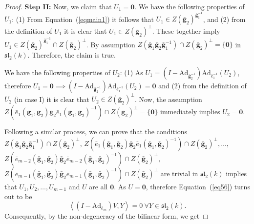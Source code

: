 \documentclass[10pt,twoside]{amsart}
\theoremstyle{definition}
\theoremstyle{definition}
\begin{document}
\begin{proof}
{\bf Step II:} Now, we claim that $U_1 = \mathbf{0}$. We have the following properties of $U_1$: (1) From Equation~(\ref{eqmain1}) it follows that $U_1 \in Z(\mathbf{\bar g}_2)^{\mathbf{\bar g}_1^{-1}}$, and (2) from the definition of $U_1$ it is clear that $U_1\in Z(\mathbf{\bar g}_2)^{\perp}$. These together imply $U_1\in Z(\mathbf{\bar g}_2)^{\mathbf{\bar g}_1^{-1}}\cap Z(\mathbf{\bar g}_2)^{\perp} $. By assumption $Z(\mathbf{\bar g}_1\mathbf{\bar g}_2\mathbf{\bar g}_1^{-1})\cap Z(\mathbf{\bar g}_2)^{\perp} = \{\mathbf{0} \}$ in $\mathfrak{sl}_2(k)$. Therefore, the claim is true.

We have the following properties of $U_2$: (1) As $U_1=(I-\mathrm{Ad}_{\mathbf{\bar g}_2^{-1}})\mathrm{Ad}_{\bar e_1^{-1}}(U_{2})$, therefore $U_1=\mathbf{0} \implies (I- \mathrm{Ad}_{\mathbf{\bar g}_2^{-1}}) \mathrm{Ad}_{\bar e_1^{-1}}(U_{2}) = \mathbf{0}$ and (2) from the definition of $U_2$ (in case I) it is clear that $U_2\in Z(\mathbf{\bar g}_2)^{\perp}$. 
Now, the assumption $Z(\bar e_1(\mathbf{\bar g}_1, \mathbf{\bar g}_2)\mathbf{\bar g}_2\bar e_1(\mathbf{\bar g}_1,\mathbf{\bar g}_2)^{-1})\cap Z(\mathbf{\bar g}_2)^{\perp}=\{\mathbf{0}\}$ immediately implies $U_2=\mathbf{0}$.
   
       
        

  
Following a similar process, we can prove that the conditions $Z(\mathbf{\bar g}_1\mathbf{\bar g}_2\mathbf{\bar g}_1^{-1})\cap Z(\mathbf{\bar g}_2)^{\perp}$, $Z(\bar e_1(\mathbf{\bar g}_1, \mathbf{\bar g}_2)\mathbf{\bar g}_2\bar e_1(\mathbf{\bar g}_1,\mathbf{\bar g}_2)^{-1})\cap Z(\mathbf{\bar g}_2)^{\perp},\ldots$, $Z(\bar e_{m-2}(\mathbf{\bar g}_1,\mathbf{\bar g}_2)\mathbf{\bar g}_2\bar e_{m-2}(\mathbf{\bar g}_1,\mathbf{\bar g}_2)^{-1})\cap Z(\mathbf{\bar g}_2)^{\perp}$, $Z(\bar e_{m-1}(\mathbf{\bar g}_1,\mathbf{\bar g}_2)\mathbf{\bar g}_2\bar e_{m-1}(\mathbf{\bar g}_1,\mathbf{\bar g}_2)^{-1})\cap Z(\mathbf{\bar g}_2)^{\perp}$  are trivial in $\mathfrak{sl}_2(k)$ implies that $U_1, U_2, \ldots, U_{m-1}$ and $U$ are all $\mathbf{0}$. As $U = \mathbf{0}$, therefore Equation~(\ref{eq56}) turns out to be 
$$\left\langle\left(I-\mathrm{Ad}_{\bar e_m}\right)V,Y\right\rangle=0\ \forall Y\in \mathfrak{sl}_2(k).$$ 
Consequently, by the non-degeneracy of the bilinear form, we get 
 

\end{proof}
\end{document}
